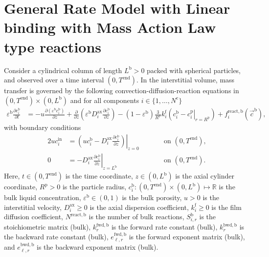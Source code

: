 \documentclass{article}
\begin{document}
\section*{General Rate Model with Linear binding with Mass Action Law type reactions}
Consider a cylindrical column of length $L^{\mathrm{b}} > 0$ packed with spherical particles, and observed over a time interval $(0, T^{\mathrm{end}})$.
In the interstitial volume, mass transfer is governed by the following convection-diffusion-reaction equations in $(0, T^{\mathrm{end}})\times (0, L^{\mathrm{b}})$ and for all components $i\in\{1, \dots, N^{\mathrm{c}} \}$
\begin{align}
    \varepsilon^{\mathrm{b}} \frac{\partial c^{\mathrm{b}}_{i}}{\partial t}
    &= - u \frac{\partial \left( \varepsilon^{\mathrm{b}} c^{\mathrm{b}}_{i} \right)}{\partial z}
        + \frac{\partial}{\partial z} \left( \varepsilon^{\mathrm{b}} D^{\mathrm{ax}}_{i} \frac{\partial c^{\mathrm{b}}_{i}}{\partial z} \right)
        - \left(1 - \varepsilon^{\mathrm{b}} \right) \frac{3}{R^{\mathrm{p}}} k^{\mathrm{f}}_{i} \left(c^{\mathrm{b}}_{i} - \left. c^{\mathrm{p}}_{i} \right|_{r = R^{\mathrm{p}}} \right)
        + f^{\mathrm{react},\mathrm{b}}_{i}\left( \vec{c}^{\mathrm{b}} \right),
\end{align}
with boundary conditions
\begin{alignat}{2}
    u c^{\mathrm{in}}_{i}
    &= \left.\left( u c^{\mathrm{b}}_{i} - D^{\mathrm{ax}}_{i} \frac{\partial c^{\mathrm{b}}_{i}}{\partial z}\right)\right|_{z=0}
    & & \qquad\text{on }(0, T^{\mathrm{end}}),
    \\
    0
    &= - D^{\mathrm{ax}}_{i} \left. \frac{\partial c^{\mathrm{b}}_{i}}{\partial z} \right|_{z=L^{\mathrm{b}}}
    & & \qquad\text{on }(0, T^{\mathrm{end}}).
\end{alignat}
Here, $t\in (0, T^{\mathrm{end}})$ is the time coordinate, $z\in (0, L^{\mathrm{b}})$ is the axial cylinder coordinate, $R^{\mathrm{p}}> 0$ is the particle radius, $c^{\mathrm{b}}_{i}\colon (0, T^{\mathrm{end}})\times (0, L^{\mathrm{b}}) \mapsto \mathbb{R}$ is the bulk liquid concentration, $\varepsilon^{\mathrm{b}}\in (0, 1)$ is the bulk porosity, $u> 0$ is the interstitial velocity, $D^{\mathrm{ax}}_{i}\geq 0$ is the axial dispersion coefficient, $k^{\mathrm{f}}_{i}\geq 0$ is the film diffusion coefficient, $N^{\mathrm{react},\mathrm{b}}$ is the number of bulk reactions, $S^{\mathrm{b}}_{i,r}$ is the stoichiometric matrix (bulk), $k^{\mathrm{fwd},\mathrm{b}}_{r}$ is the forward rate constant (bulk), $k^{\mathrm{bwd},\mathrm{b}}_{r}$ is the backward rate constant (bulk), $e^{\mathrm{fwd},\mathrm{b}}_{\ell,r}$ is the forward exponent matrix (bulk), and $e^{\mathrm{bwd},\mathrm{b}}_{\ell,r}$ is the backward exponent matrix (bulk).
\end{document}
